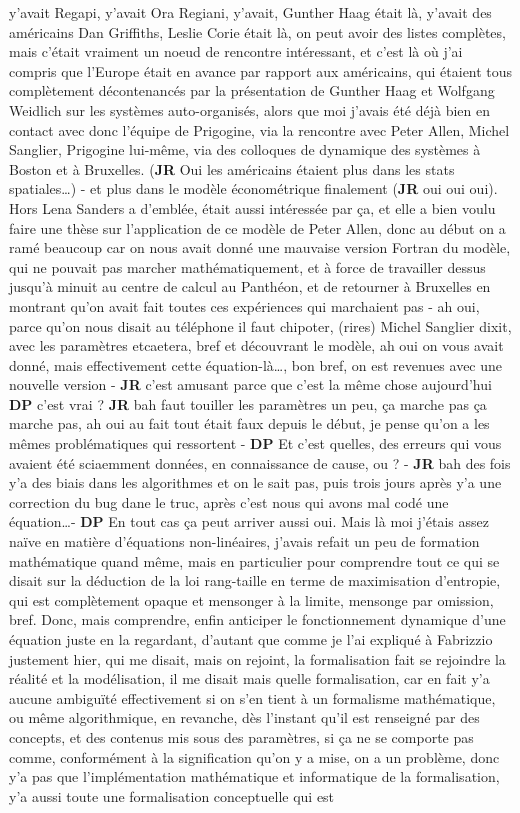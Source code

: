 \documentclass[12pt]{article}
\begin{document}
y'avait Regapi, y'avait Ora Regiani, y'avait, Gunther Haag était là, y'avait des américains Dan Griffiths, Leslie Corie était là, on peut avoir des listes complètes, mais c'était vraiment un noeud de rencontre intéressant, et c'est là où j'ai compris que l'Europe était en avance par rapport aux américains, qui étaient tous complètement décontenancés par la présentation de Gunther Haag et Wolfgang Weidlich sur les systèmes auto-organisés, alors que moi j'avais été déjà bien en contact avec donc l'équipe de Prigogine, via la rencontre avec Peter Allen, Michel Sanglier, Prigogine lui-même, via des colloques de dynamique des systèmes à Boston et à Bruxelles. (\textbf{JR} Oui les américains étaient plus dans les stats spatiales\ldots ) - et plus dans le modèle économétrique finalement (\textbf{JR} oui oui oui). Hors Lena Sanders a d'emblée, était aussi intéressée par ça, et elle a bien voulu faire une thèse sur l'application de ce modèle de Peter Allen, donc au début on a ramé beaucoup car on nous avait donné une mauvaise version Fortran du modèle, qui ne pouvait pas marcher mathématiquement, et à force de travailler dessus jusqu'à minuit au centre de calcul au Panthéon, et de retourner à Bruxelles en montrant qu'on avait fait toutes ces expériences qui marchaient pas - ah oui, parce qu'on nous disait au téléphone il faut chipoter, (rires) Michel Sanglier dixit, avec les paramètres etcaetera, bref et découvrant le modèle, ah oui on vous avait donné, mais effectivement cette équation-là\ldots , bon bref, on est revenues avec une nouvelle version - \textbf{JR} c'est amusant parce que c'est la même chose aujourd'hui \textbf{DP} c'est vrai ? \textbf{JR} bah faut touiller les paramètres un peu, ça marche pas ça marche pas, ah oui au fait tout était faux depuis le début, je pense qu'on a les mêmes problématiques qui ressortent - \textbf{DP} Et c'est quelles, des erreurs qui vous avaient été sciaemment données, en connaissance de cause, ou ? - \textbf{JR} bah des fois y'a des biais dans les algorithmes et on le sait pas, puis trois jours après y'a une correction du bug dane le truc, après c'est nous qui avons mal codé une équation\ldots - \textbf{DP} En tout cas ça peut arriver aussi oui. Mais là moi j'étais assez naïve en matière d'équations non-linéaires, j'avais refait un peu de formation mathématique quand même, mais en particulier pour comprendre tout ce qui se disait sur la déduction de la loi rang-taille en terme de maximisation d'entropie, qui est complètement opaque et mensonger à la limite, mensonge par omission, bref. Donc, mais comprendre, enfin anticiper le fonctionnement dynamique d'une équation juste en la regardant, d'autant que comme je l'ai expliqué à Fabrizzio justement hier, qui me disait, mais on rejoint, la formalisation fait se rejoindre la réalité et la modélisation, il me disait mais quelle formalisation, car en fait y'a aucune ambiguïté effectivement si on s'en tient à un formalisme mathématique, ou même algorithmique, en revanche, dès l'instant qu'il est renseigné par des concepts, et des contenus mis sous des paramètres, si ça ne se comporte pas comme, conformément à la signification qu'on y a mise, on a un problème, donc y'a pas que l'implémentation mathématique et informatique de la formalisation, y'a aussi toute une formalisation conceptuelle qui est 
\end{document}
